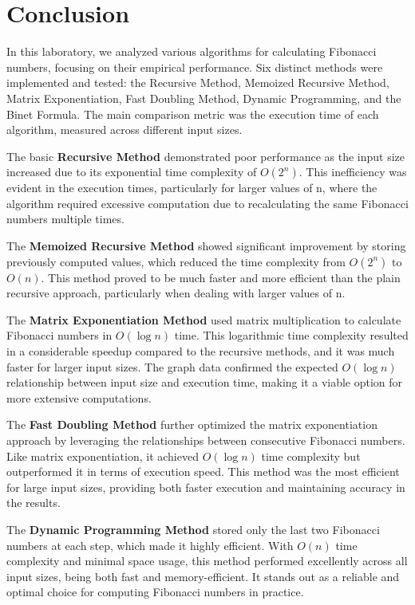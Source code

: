 \documentclass[a4paper, 12pt]{article}
\begin{document}
\section{Conclusion}
\label{sec:orgedc434d}
In this laboratory, we analyzed various algorithms for calculating Fibonacci numbers, focusing on their empirical performance. Six distinct methods were implemented and tested: the Recursive Method, Memoized Recursive Method, Matrix Exponentiation, Fast Doubling Method, Dynamic Programming, and the Binet Formula. The main comparison metric was the execution time of each algorithm, measured across different input sizes.

The basic \textbf{\textbf{Recursive Method}} demonstrated poor performance as the input size increased due to its exponential time complexity of \(O(2^n)\). This inefficiency was evident in the execution times, particularly for larger values of n, where the algorithm required excessive computation due to recalculating the same Fibonacci numbers multiple times.

The \textbf{\textbf{Memoized Recursive Method}} showed significant improvement by storing previously computed values, which reduced the time complexity from \(O(2^n)\) to \(O(n)\). This method proved to be much faster and more efficient than the plain recursive approach, particularly when dealing with larger values of n.

The \textbf{\textbf{Matrix Exponentiation Method}} used matrix multiplication to calculate Fibonacci numbers in \(O(\log n)\) time. This logarithmic time complexity resulted in a considerable speedup compared to the recursive methods, and it was much faster for larger input sizes. The graph data confirmed the expected \(O(\log n)\) relationship between input size and execution time, making it a viable option for more extensive computations.

The \textbf{\textbf{Fast Doubling Method}} further optimized the matrix exponentiation approach by leveraging the relationships between consecutive Fibonacci numbers. Like matrix exponentiation, it achieved \(O(\log n)\) time complexity but outperformed it in terms of execution speed. This method was the most efficient for large input sizes, providing both faster execution and maintaining accuracy in the results.

The \textbf{\textbf{Dynamic Programming Method}} stored only the last two Fibonacci numbers at each step, which made it highly efficient. With \(O(n)\) time complexity and minimal space usage, this method performed excellently across all input sizes, being both fast and memory-efficient. It stands out as a reliable and optimal choice for computing Fibonacci numbers in practice.
\end{document}
